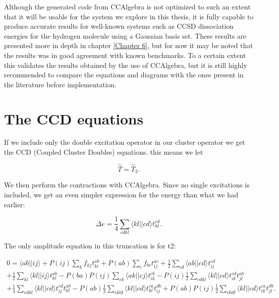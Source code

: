 Although the generated code from CCAlgebra is not optimized to such an extent that it will be usable for the system we explore in this thesis, it is fully capable to produce accurate results for well-known systems such as CCSD dissociation energies for the hydrogen molecule using a Gaussian basis set. These results are presented more in depth in chapter \ref{Chapter 6}, but for now it may be noted that the results was in good agreement with known benchmarks. To a certain extent this validates the results obtained by the use of CCAlgebra, but it is still highly recommended to compare the equations and diagrams with the ones present in the literature before implementation.

\section{The CCD equations}

If we include only the double excitation operator in our cluster operator we get the CCD (Coupled Cluster Doubles) equations. this means we let 

\begin{equation}
\hat{T} = \hat{T}_2.
\end{equation}

We then perform the contractions with CCAlgebra. Since no single excitations is included, we get an even simpler expression for the energy than what we had earlier:

\begin{equation}
\Delta e = \frac{1}{4} \sum_{cdkl} \langle kl || cd \rangle t_{kl}^{cd}.
\end{equation}

The only amplitude equation in this truncation is for t2:

\begin{multline}
0 =\langle ab \vert \vert ij \rangle + 
P(ij) \sum_{k} f_{kj} t_{ki}^{ab}+P(ab) \sum_{c} f_{bc} t_{ij}^{ac}+
\frac{1}{2} \sum_{cd} \langle ab \vert \vert cd \rangle t_{ij}^{cd} \\
+\frac{1}{2} \sum_{kl} \langle kl \vert \vert ij \rangle t_{kl}^{ab}-
P(ba)P(ij) \sum_{ck} \langle ak \vert \vert cj \rangle t_{ik}^{cb}- 
P(ij)\frac{1}{2} \sum_{cdkl} \langle kl \vert \vert cd \rangle t_{ik}^{cd} t_{jl}^{ab}\\
+\frac{1}{4} \sum_{cdkl} \langle kl \vert \vert cd \rangle t_{ij}^{cd} t_{kl}^{ab}-
 P(ab)\frac{1}{2} \sum_{ckld} \langle kl \vert \vert cd \rangle t_{kl}^{ca} t_{ij}^{db}+
P(ab)P(ij)\frac{1}{2} \sum_{ckdl} \langle kl \vert \vert cd \rangle t_{ik}^{ca} t_{jl}^{db}.
\end{multline}

